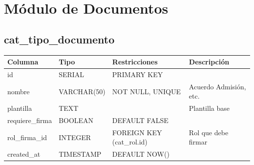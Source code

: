 \documentclass[12pt, a4paper]{article}
\begin{document}
\section{Módulo de Documentos}
\label{sec:documentos}

\subsection{cat\_tipo\_documento}
\begin{longtable}{|p{3.5cm}|p{2.5cm}|p{3cm}|p{5cm}|}
    \hline
    \rowcolor[gray]{0.9}
    \textbf{Columna} & \textbf{Tipo} & \textbf{Restricciones} & \textbf{Descripción} \\
    \hline
    id & SERIAL & PRIMARY KEY & \\
    \hline
    nombre & VARCHAR(50) & NOT NULL, UNIQUE & Acuerdo Admisión, etc. \\
    \hline
    plantilla & TEXT & & Plantilla base \\
    \hline
    requiere\_firma & BOOLEAN & DEFAULT FALSE & \\
    \hline
    rol\_firma\_id & INTEGER & FOREIGN KEY (cat\_rol.id) & Rol que debe firmar \\
    \hline
    created\_at & TIMESTAMP & DEFAULT NOW() & \\
    \hline
\end{longtable}
\end{document}
